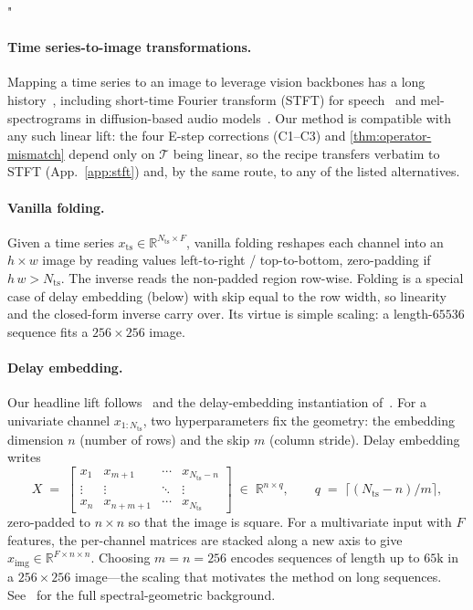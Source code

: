 "\documentclass{article}
\theoremstyle{plain}
\theoremstyle{definition}
\theoremstyle{remark}
\newcommand{\tsimg}{\mathcal{T}}
\newcommand{\Nts}{N_{\mathrm{ts}}}
\newcommand{\xts}{x_{\mathrm{ts}}}
\newcommand{\ximg}{x_{\mathrm{img}}}
\begin{document}
\paragraph{Time series-to-image transformations.}
Mapping a time series to an image to leverage vision backbones has a long history~\citep{wang2015imaging, hatami2018classification, li2024time}, including short-time Fourier transform (STFT) for speech~\citep{griffin1984signal, allen1977short} and mel-spectrograms in diffusion-based audio models~\citep{popov2021grad, liu2023audioldm}. Our method is compatible with any such linear lift: the four E-step corrections (C1--C3) and \cref{thm:operator-mismatch} depend only on $\tsimg$ being linear, so the recipe transfers verbatim to STFT (App.~\ref{app:stft}) and, by the same route, to any of the listed alternatives.

\paragraph{Vanilla folding.}
Given a time series $\xts \in \mathbb{R}^{\Nts \times F}$, vanilla folding reshapes each channel into an $h \times w$ image by reading values left-to-right / top-to-bottom, zero-padding if $h\,w > \Nts$. The inverse reads the non-padded region row-wise. Folding is a special case of delay embedding (below) with skip equal to the row width, so linearity and the closed-form inverse carry over. Its virtue is simple scaling: a length-$65536$ sequence fits a $256\times 256$ image.

\paragraph{Delay embedding.}
Our headline lift follows~\citet{takens2006detecting} and the delay-embedding instantiation of~\citet{naiman2024imagentime}. For a univariate channel $x_{1:\Nts}$, two hyperparameters fix the geometry: the embedding dimension $n$ (number of rows) and the skip $m$ (column stride). Delay embedding writes
\[
X \;=\; \begin{bmatrix}
x_1 & x_{m+1} & \cdots & x_{\Nts - n} \\
\vdots & \vdots & \ddots & \vdots \\
x_n & x_{n+m+1} & \cdots & x_{\Nts}
\end{bmatrix}
\;\in\; \mathbb{R}^{n \times q}, \qquad q \;=\; \lceil (\Nts - n)/m \rceil,
\]
zero-padded to $n \times n$ so that the image is square. For a multivariate input with $F$ features, the per-channel matrices are stacked along a new axis to give $\ximg \in \mathbb{R}^{F \times n \times n}$. Choosing $m = n = 256$ encodes sequences of length up to $65\mathrm{k}$ in a $256 \times 256$ image---the scaling that motivates the method on long sequences. See~\citep{takens2006detecting, naiman2024imagentime} for the full spectral-geometric background.
\end{document}
